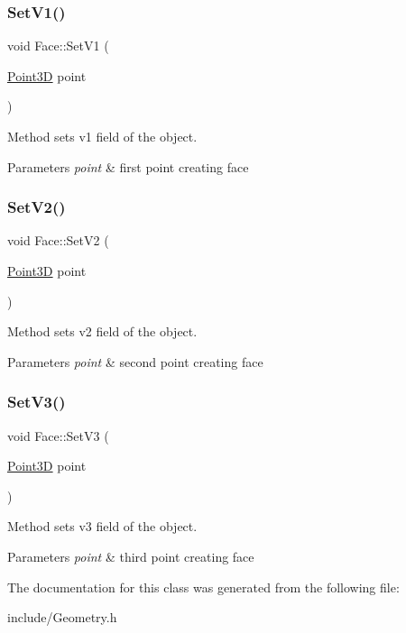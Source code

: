 \subsubsection{\texorpdfstring{Set\+V1()}{SetV1()}}
{\footnotesize\ttfamily void Face\+::\+Set\+V1 (\begin{DoxyParamCaption}\item[{\hyperlink{class_point3_d}{Point3D}}]{point }\end{DoxyParamCaption})}

Method sets v1 field of the object. 
\begin{DoxyParams}{Parameters}
{\em point} & first point creating face \\
\hline
\end{DoxyParams}
\hypertarget{class_face_ad4cd189f6de7169d1b7d256fc76836e7}{}\label{class_face_ad4cd189f6de7169d1b7d256fc76836e7} 
\subsubsection{\texorpdfstring{Set\+V2()}{SetV2()}}
{\footnotesize\ttfamily void Face\+::\+Set\+V2 (\begin{DoxyParamCaption}\item[{\hyperlink{class_point3_d}{Point3D}}]{point }\end{DoxyParamCaption})}

Method sets v2 field of the object. 
\begin{DoxyParams}{Parameters}
{\em point} & second point creating face \\
\hline
\end{DoxyParams}
\hypertarget{class_face_a81311d36d3f1bb6f7b92629c327a06aa}{}\label{class_face_a81311d36d3f1bb6f7b92629c327a06aa} 
\subsubsection{\texorpdfstring{Set\+V3()}{SetV3()}}
{\footnotesize\ttfamily void Face\+::\+Set\+V3 (\begin{DoxyParamCaption}\item[{\hyperlink{class_point3_d}{Point3D}}]{point }\end{DoxyParamCaption})}

Method sets v3 field of the object. 
\begin{DoxyParams}{Parameters}
{\em point} & third point creating face \\
\hline
\end{DoxyParams}


The documentation for this class was generated from the following file\+:\begin{DoxyCompactItemize}
\item 
include/Geometry.\+h\end{DoxyCompactItemize}
